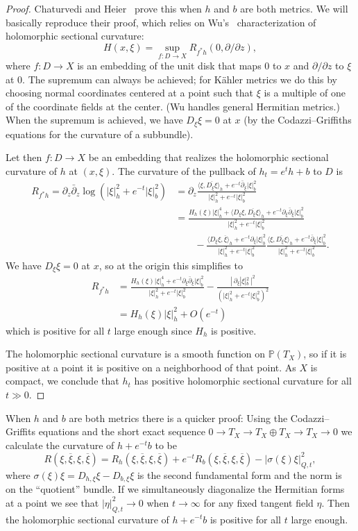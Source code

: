 \documentclass[10pt,a4paper]{amsart}
\newcommand{\kk}[1]{\mathbb{#1}}
\def\<{\langle}
\def\>{\rangle}
\def\ov#1{\overline{#1}}
\def\hsc{holomorphic sectional curvature}
\begin{document}
\begin{proof}
Chaturvedi and Heier~\cite{chaturvedi2020hermitian} prove this when $h$ and $b$
are both metrics.
We will basically reproduce their proof, which relies on
Wu's~\cite{wu1973remark} characterization of \hsc:
$$
H(x, \xi) = \sup_{f : D \to X} R_{f^*h}(0, \partial/\partial z),
$$
where $f : D \to X$ is an embedding of the unit disk that maps
$0$ to $x$ and $\partial/\partial z$ to $\xi$ at $0$.
The supremum can always be achieved; for K\"ahler metrics we do this by
choosing normal coordinates centered at a point such that $\xi$ is a multiple
of one of the coordinate fields at the center. (Wu handles general Hermitian
metrics.) When the supremum is achieved, we have $D_\xi \xi = 0$ at $x$ (by the
Codazzi--Griffiths equations for the curvature of a subbundle).

Let then $f : D \to X$ be an embedding that realizes the \hsc{} of $h$ at
$(x,\xi)$.
The curvature of the pullback of $h_t = e^t h + b$ to $D$ is
\begin{align*}
R_{f^*h}
= \partial_z \bar\partial_z \log(|\xi|^2_h + e^{-t} |\xi|^2_b)
&= \partial_z \frac{\<\xi, \ov{D_\xi\xi}\>_h + e^{-t} \bar\partial_\xi |\xi|^2_b}{|\xi|^2_h + e^{-t} |\xi|^2_b}
\\
&= \frac{H_h(\xi)|\xi|^4_h + \<D_\xi \xi, \ov{D_\xi\xi}\>_h + e^{-t} \partial_\xi\bar\partial_\xi |\xi|^2_b}{|\xi|^2_h + e^{-t} |\xi|^2_b}
\\
&\qquad
- \frac{\<D_\xi \xi, \ov{\xi}\>_h + e^{-t} \partial_\xi |\xi|^2_b}{|\xi|^2_h + e^{-t} |\xi|^2_b}
\frac{\<\xi, \ov{D_\xi\xi}\>_h + e^{-t} \bar\partial_\xi |\xi|^2_b}{|\xi|^2_h + e^{-t} |\xi|^2_b}.
\end{align*}
We have $D_\xi \xi = 0$ at $x$, so at the origin this simplifies to
\begin{align*}
R_{f^*h}
&= \frac{H_h(\xi)|\xi|^4_h + e^{-t} \partial_\xi\bar\partial_\xi |\xi|^2_b}{|\xi|^2_h + e^{-t} |\xi|^2_b}
- \frac{|\, \partial_\xi |\xi|^2_b \,|^2}{(|\xi|^2_h + e^{-t} |\xi|^2_b)^2}
\\
&= H_h(\xi) |\xi|^2_h + O(e^{-t})
\end{align*}
which is positive for all $t$ large enough since $H_h$ is positive.

The \hsc{} is a smooth function on $\kk P(T_X)$, so if it is positive at a
point it is positive on a neighborhood of that point.
As $X$ is compact, we conclude that $h_t$ has positive \hsc{} for all $t \gg 0$.
\end{proof}


When $h$ and $b$ are both metrics there is a quicker proof:
Using the Codazzi--Griffits equations and the short exact sequence $0 \to T_X
\to T_X \oplus T_X \to T_X \to 0$ we calculate the curvature of $h+e^{-t} b$ to be
$$
R(\xi, \ov\xi, \xi, \ov\xi)
= R_h(\xi, \ov\xi, \xi, \ov\xi)
+ e^{-t} R_b(\xi, \ov\xi, \xi, \ov\xi)
- |\sigma(\xi)\xi|^2_{Q,t},
$$
where $\sigma(\xi)\xi = D_{h,\xi}\xi - D_{b,\xi} \xi$ is the second fundamental
form and the norm is on the ``quotient'' bundle.
If we simultaneously diagonalize the Hermitian forms at a point we see that
$|\eta|^2_{Q,t} \to 0$ when $t \to \infty$ for any fixed tangent field
$\eta$. Then the \hsc{} of $h + e^{-t} b$ is positive for all $t$ large enough.
\end{document}
